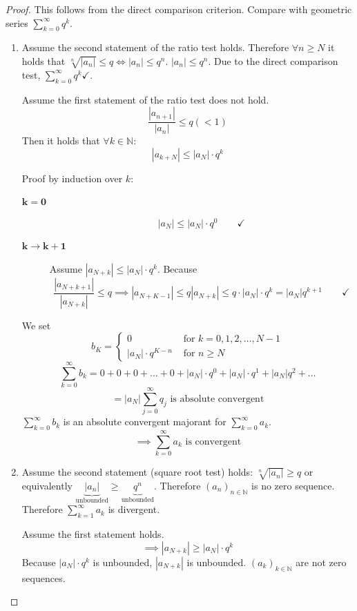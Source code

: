 \documentclass[a4paper,landscape,twocolumn]{article}
\theoremstyle{definition}
\newcommand\abs[1]{\left|#1\right|}
\newcommand\seq[1]{{\left(#1\right)}_{n \in \mathbb N}}
\begin{document}
\begin{proof}
  This follows from the direct comparison criterion. Compare with geometric series
  $\sum_{k=0}^\infty q^k$.
  \begin{enumerate}
    \item
      Assume the second statement of the ratio test holds. Therefore $\forall n \geq N$
      it holds that $\sqrt[n]{\abs{a_n}} \leq q \iff \abs{a_n} \leq q^n$.
      $\abs{a_n} \leq q^n$.
      Due to the direct comparison test, $\sum_{k=0}^\infty q^k \checkmark$.

      Assume the first statement of the ratio test does not hold.
      \[ \frac{\abs{a_{n+1}}}{\abs{a_n}} \leq q (< 1) \]
      Then it holds that $\forall k \in \mathbb N$:
      \[ \abs{a_{k+N}} \leq \abs{a_N} \cdot q^k \]

      Proof by induction over $k$:
      \begin{description}
        \item[$\mathbf{k=0}$] \[ \abs{a_N} \leq \abs{a_N} \cdot q^0 \qquad\checkmark \]
        \item[$\mathbf{k\to k+1}$]
          Assume $\abs{a_{N+k}} \leq \abs{a_N} \cdot q^k$.
          Because
          \[
            \frac{\abs{a_{N+k+1}}}{\abs{a_{N+k}}} \leq q
            \implies \abs{a_{N+K-1}} \leq q \abs{a_{N+k}}
            \leq q \cdot \abs{a_N} \cdot q^k
            = \abs{a_N} q^{k+1}
            \qquad \checkmark
          \]
      \end{description}
      We set
      \[
        b_K = \begin{cases}
          0 & \text{ for } k = 0,1,2,\dots,N-1 \\
          \abs{a_N} \cdot q^{K-n} & \text{ for } n \geq N
        \end{cases}
      \]
      \[ \sum_{k=0}^\infty b_k = 0 + 0 + 0 + \dots + 0 + \abs{a_N} \cdot q^0 + \abs{a_N} \cdot q^1 + \abs{a_N} q^2 + \ldots \]
      \[ = \abs{a_N} \sum_{j=0}^\infty q_j \text{ is absolute convergent} \]
      $\sum_{k=0}^\infty b_k$ is an absolute convergent majorant for $\sum_{k=0}^\infty a_k$.
      \[ \implies \sum_{k=0}^\infty a_k \text{ is convergent} \]
    \item
      Assume the second statement (square root test) holds: $\sqrt[n]{\abs{a_n}} \geq q$
      or equivalently $\underbrace{\abs{a_n}}_{\text{unbounded}} \geq \underbrace{q^n}_{\text{unbounded}}$.
      Therefore $\seq{a_n}$ is no zero sequence.
      Therefore $\sum_{k=1}^\infty a_k$ is divergent.

      Assume the first statement holds.
      \[ \implies \abs{a_{N+k}} \geq \abs{a_N} \cdot q^k \]
      Because $\abs{a_N} \cdot q^k$ is unbounded, $\abs{a_{N+k}}$ is unbounded.
      $\left(a_k\right)_{k\in\mathbb N}$ are not zero sequences.
  \end{enumerate}
\end{proof}
\end{document}
